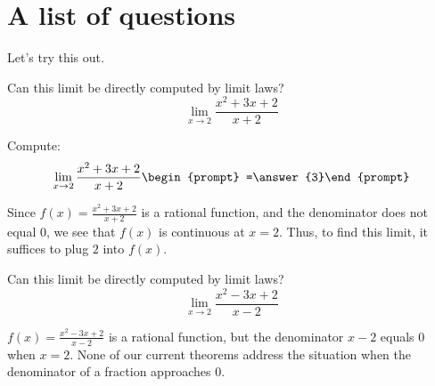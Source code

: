 \documentclass{ximera}
\begin{document}
\section{A list of questions}

Let's try this out.

\begin{question}
  Can this limit be directly computed by limit laws?
  \[
  \lim_{x\to 2}\frac{x^2+3x+2}{x+2} 
  \]
  \begin{prompt}
  \begin{multipleChoice}
  \end{multipleChoice}
  \begin{question}
    Compute:
    \[
    \lim_{x\to 2}\frac{x^2+3x+2}{x+2}\begin{prompt} =\answer{3}\end{prompt}
    \]
    \begin{feedback}
      Since $f(x)=\frac{x^2+3x+2}{x+2}$ is a rational function, and
      the denominator does not equal $0$, we see that $f(x)$ is
      continuous at $x=2$.  Thus, to find this limit, it suffices to
      plug $2$ into $f(x)$.
    \end{feedback}
  \end{question}
  \end{prompt}
\end{question}


\begin{question}
  Can this limit be directly computed by limit laws?
  \[
  \lim_{x\to 2}\frac{x^2-3x+2}{x-2}
  \]
  \begin{prompt}
  \begin{multipleChoice}
  \end{multipleChoice}
  \begin{feedback}
    $f(x) = \frac{x^2-3x+2}{x-2}$ is a rational function, but the
    denominator $x-2$ equals $0$ when $x=2$. None of our current
    theorems address the situation when the denominator of a fraction
    approaches $0$.
  \end{feedback}
  \end{prompt}
\end{question}
\end{document}
